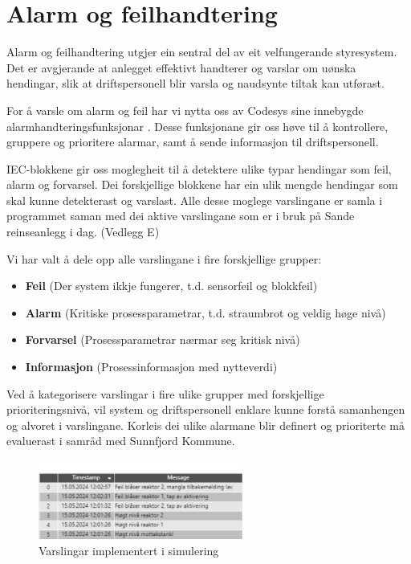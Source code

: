 \newpage
\section{Alarm og feilhandtering}
\thispagestyle{fancy}

Alarm og feilhandtering utgjer ein sentral del av eit velfungerande styresystem. Det er avgjerande
at anlegget effektivt handterer og varslar om uønska hendingar, slik at 
driftspersonell blir varsla og naudsynte tiltak kan utførast. \nocite{Olav}

For å varsle om alarm og feil har vi nytta oss av \gls{Codesys} sine
innebygde alarmhandteringsfunksjonar \citep{CodesysAlarm}. Desse funksjonane gir oss høve til å 
kontrollere, gruppere og prioritere alarmar, samt å sende informasjon til driftspersonell.

\gls{IEC}-blokkene gir oss moglegheit til å detektere ulike typar hendingar som feil, alarm og forvarsel.
Dei forskjellige blokkene har ein ulik mengde hendingar som skal kunne detekterast og varslast.
Alle desse moglege varslingane er samla i programmet saman med dei aktive varslingane som er i bruk på Sande reinseanlegg i dag. (Vedlegg E)

Vi har valt å dele opp alle varslingane i fire forskjellige grupper:

\begin{itemize}
    \item \textbf{Feil}          (Der system ikkje fungerer, t.d. sensorfeil og blokkfeil)
    \item \textbf{Alarm}         (Kritiske prosessparametrar, t.d. straumbrot og veldig høge nivå)
    \item \textbf{Forvarsel}     (Prosessparametrar nærmar seg kritisk nivå)
    \item \textbf{Informasjon}   (Prosessinformasjon med nytteverdi)
\end{itemize}

Ved å kategorisere varslingar i fire ulike grupper med forskjellige prioriteringsnivå,
vil system og driftspersonell enklare kunne forstå samanhengen og alvoret i varslingane. \newline
Korleis dei ulike alarmane blir definert og prioriterte må evaluerast i samråd med \gls{Sunnfjord Kommune}.

\begin{figure}[htbp]
    \centering
    \includegraphics[width=0.6\textwidth]{Bilder/Alarmeksempel.png}
    \caption{Varslingar implementert i simulering}\label{fig:Alarmlogg}
\end{figure}

\newpage

